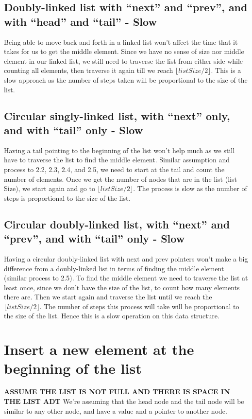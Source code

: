 \documentclass{article}
\begin{document}
\subsection{Doubly-linked list with “next” and “prev”, and with “head” and “tail” - Slow}
Being able to move back and forth in a linked list won't affect the time that it takes for us to get the middle element. Since we have no sense of size nor middle element in our linked list, we still need to traverse the list from either side while counting all elements, then traverse it again till we reach $\lfloor {listSize/2} \rfloor$. This is a slow approach as the number of steps taken will be proportional to the size of the list.

\subsection{Circular singly-linked list, with “next” only, and with “tail” only - Slow}
Having a tail pointing to the beginning of the list won't help much as we still have to traverse the list to find the middle element. Similar assumption and process to 2.2, 2.3, 2.4, and 2.5, we need to start at the tail and count the number of elements. Once we get the number of nodes that are in the list (list Size), we start again and go to $\lfloor {listSize/2} \rfloor$. The process is slow as the number of steps is proportional to the size of the list. 

\subsection{Circular doubly-linked list, with “next” and “prev”, and with “tail” only - Slow}
Having a circular doubly-linked list with next and prev pointers won't make a big difference from a doubly-linked list in terms of finding the middle element (similar process to 2.5). To find the middle element we need to traverse the list at least once, since we don't have the size of the list, to count how many elements there are. Then we start again and traverse the list until we reach the $\lfloor {listSize/2} \rfloor$. The number of steps this process will take will be proportional to the size of the list. Hence this is a slow operation on this data structure.



\section{Insert a new element at the beginning of the list}
\textbf{ASSUME THE LIST IS NOT FULL AND THERE IS SPACE IN THE LIST ADT}
We're assuming that the head node and the tail node will be similar to any other node, and have a value and a pointer to another node.
\end{document}
